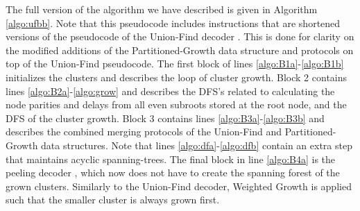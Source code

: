 The full version of the algorithm we have described is given in Algorithm \ref{algo:ufbb}. Note that this pseudocode includes instructions that are shortened versions of the pseudocode of the Union-Find decoder \cite{delfosse2017almost}. This is done for clarity on the modified additions of the Partitioned-Growth data structure and protocols on top of the Union-Find pseudocode. The first block of lines \ref{algo:B1a}-\ref{algo:B1b} initializes the clusters and describes the loop of cluster growth. Block 2 contains lines \ref{algo:B2a}-\ref{algo:grow} and describes the DFS's related to calculating the node parities and delays from all even subroots stored at the root node, and the DFS of the cluster growth. Block 3 contains lines \ref{algo:B3a}-\ref{algo:B3b} and describes the combined merging protocols of the Union-Find and Partitioned-Growth data structures. Note that lines \ref{algo:dfa}-\ref{algo:dfb} contain an extra step that maintains acyclic spanning-trees. The final block in line \ref{algo:B4a} is the peeling decoder \cite{delfosse2017linear}, which now does not have to create the spanning forest of the grown clusters. Similarly to the Union-Find decoder, Weighted Growth is applied such that the smaller cluster is always grown first. 

